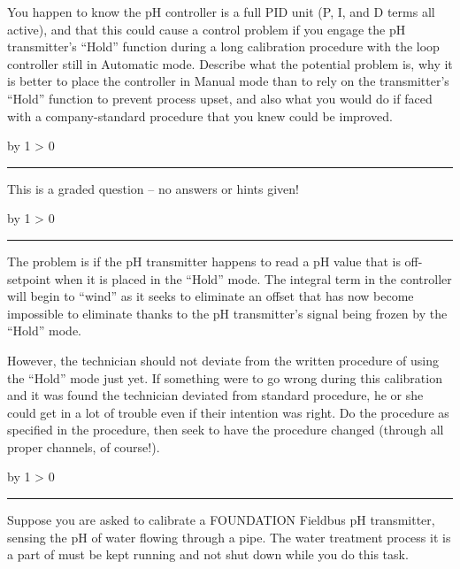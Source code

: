 \documentclass[12pt,a4paper]{article}
\def\oppgave{
            \advance\questnum by 1
            \ifnum \questnum > 0
                 \hrule
                 \vskip 3pt
                 \leftline{Oppgave \the\questnum}
                 \vskip 3pt \fi}
\def\svar{
           \advance\answnum by 1
           \ifnum \answnum > 0
                \hrule
                \vskip 3pt
                \leftline{Svar \the\answnum}
                \vskip 3pt \fi}
\def\notes{
           \advance\explnum by 1
           \ifnum \explnum > 0
                \hrule
                \vskip 3pt
                \leftline{Notes \the\explnum}
                \vskip 3pt \fi}
\begin{document}
\vskip 10pt

You happen to know the pH controller is a full PID unit (P, I, and D terms all active), and that this could cause a control problem if you engage the pH transmitter's ``Hold'' function during a long calibration procedure with the loop controller still in Automatic mode.  Describe what the potential problem is, why it is better to place the controller in Manual mode than to rely on the transmitter's ``Hold'' function to prevent process upset, and also what you would do if faced with a company-standard procedure that you knew could be improved.

\vfil

\eject
\vskip 10pt \filbreak 





\svar{} 

This is a graded question -- no answers or hints given!

\vskip 10pt \filbreak 





\notes{} 

The problem is if the pH transmitter happens to read a pH value that is off-setpoint when it is placed in the ``Hold'' mode.  The integral term in the controller will begin to ``wind'' as it seeks to eliminate an offset that has now become impossible to eliminate thanks to the pH transmitter's signal being frozen by the ``Hold'' mode.

However, the technician should not deviate from the written procedure of using the ``Hold'' mode just yet.  If something were to go wrong during this calibration and it was found the technician deviated from standard procedure, he or she could get in a lot of trouble even if their intention was right.  Do the procedure as specified in the procedure, then seek to have the procedure changed (through all proper channels, of course!).


\vfil \eject 



\oppgave{} 

Suppose you are asked to calibrate a FOUNDATION Fieldbus pH transmitter, sensing the pH of water flowing through a pipe.  The water treatment process it is a part of must be kept running and not shut down while you do this task.  
\end{document}
